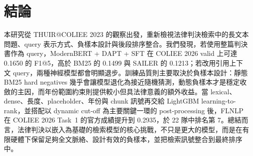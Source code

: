 \section{結論}

本研究從 THUIR@COLIEE 2023 的觀察出發，重新檢視法律判決檢索中的長文本問題、query 表示方式、負樣本設計與後段排序整合。我們發現，若使用整篇判決書作為 query，ModernBERT + DAPT + SFT 在 COLIEE 2026 valid 上可達 0.1650 的 F1@5，高於 BM25 的 0.1499 與 SAILER 的 0.1213；若改用引用上下文 query，兩種神經模型都會明顯退步。訓練品質則主要取決於負樣本設計：靜態 BM25 hard negatives 幾乎會讓模型退化為接近隨機猜測，動態負樣本才是穩定收斂的主因，而年份範圍約束則提供較小但具法律意義的額外收益。當 lexical、dense、長度、placeholder、年份與 chunk 訊號再交給 LightGBM learning-to-rank，並搭配以 dynamic cut-off 為主要關鍵一環的 post-processing 後，FLNLP 在 COLIEE 2026 Task~1 的官方成績提升到 0.2935，於 22 隊中排名第 7。總結而言，法律判決以嵌入為基礎的檢索模型的核心挑戰，不只是更大的模型，而是在有限硬體下保留足夠全文脈絡、設計有效的負樣本，並把檢索訊號整合到最終排序中。
